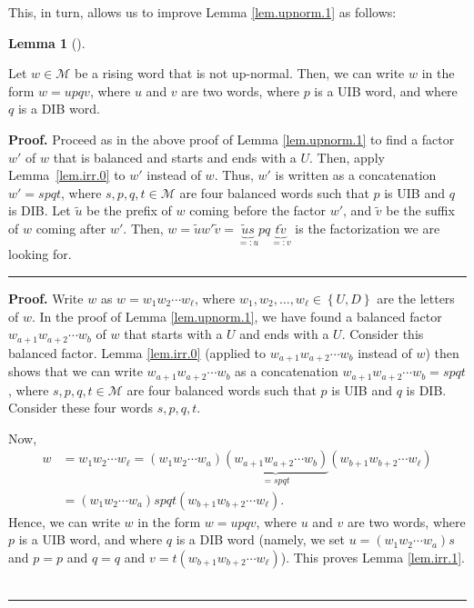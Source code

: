 \documentclass[numbers=enddot,12pt,final,onecolumn,notitlepage]{scrartcl}%
\theoremstyle{definition}
\newtheorem{lem}[theo]{Lemma}
\newenvironment{lemma}[1][]
{\begin{lem}[#1]\begin{leftbar}}
{\end{leftbar}\end{lem}}
\newenvironment{proof}[1][Proof]{\noindent\textbf{#1.} }{\ \rule{0.5em}{0.5em}}
\newcommand{\M}{\mathcal{M}}
\newenvironment{verlong}{}{}
\newenvironment{vershort}{}{}
\begin{document}
This, in turn, allows us to improve Lemma \ref{lem.upnorm.1} as follows:

\begin{lemma}
\label{lem.irr.1}Let $w\in\M$ be a rising word that is not up-normal.
Then, we can write $w$ in the form $w=upqv$, where $u$ and $v$ are two words,
where $p$ is a UIB word, and where $q$ is a DIB word.
\end{lemma}

\begin{vershort}
\begin{proof}
Proceed as in the above proof of Lemma \ref{lem.upnorm.1} to find a factor $w'$ of $w$ that is balanced and starts and ends with a $U$.
Then, apply Lemma~\ref{lem.irr.0} to $w'$ instead of $w$.
Thus, $w'$ is written as a concatenation $w' = spqt$,
where $s,p,q,t\in\M$ are four balanced words such that $p$ is UIB and $q$ is DIB.
Let $\widetilde{u}$ be the prefix of $w$ coming before the factor $w'$, and $\widetilde{v}$ be the suffix of $w$ coming after $w'$.
Then, $w = \widetilde{u} w' \widetilde{v} = \underbrace{\widetilde{u} s}_{=:u} p q \underbrace{t \widetilde{v}}_{=:v}$
is the factorization we are looking for.
\end{proof}
\end{vershort}

\begin{verlong}
\begin{proof}
Write $w$ as $w=w_{1}w_{2}\cdots w_{\ell}$, where $w_{1},w_{2},\ldots,w_{\ell
}\in\left\{  U,D\right\}  $ are the letters of $w$. In the proof of Lemma
\ref{lem.upnorm.1}, we have found a balanced factor $w_{a+1}w_{a+2}\cdots
w_{b}$ of $w$ that starts with a $U$ and ends with a $U$. Consider this
balanced factor. Lemma \ref{lem.irr.0} (applied to $w_{a+1}w_{a+2}\cdots
w_{b}$ instead of $w$) then shows that we can write $w_{a+1}w_{a+2}\cdots
w_{b}$ as a concatenation $w_{a+1}w_{a+2}\cdots w_{b}=spqt$, where
$s,p,q,t\in\M$ are four balanced words such that $p$ is UIB and $q$
is DIB. Consider these four words $s,p,q,t$.

Now,%
\begin{align*}
w  & =w_{1}w_{2}\cdots w_{\ell}=\left(  w_{1}w_{2}\cdots w_{a}\right)
\underbrace{\left(  w_{a+1}w_{a+2}\cdots w_{b}\right)  }_{=spqt}\left(
w_{b+1}w_{b+2}\cdots w_{\ell}\right)  \\
& =\left(  w_{1}w_{2}\cdots w_{a}\right)  spqt\left(  w_{b+1}w_{b+2}\cdots
w_{\ell}\right)  .
\end{align*}
Hence, we can write $w$ in the form $w=upqv$, where $u$ and $v$ are two words,
where $p$ is a UIB word, and where $q$ is a DIB word (namely, we set
$u=\left(  w_{1}w_{2}\cdots w_{a}\right)  s$ and $p=p$ and $q=q$ and
$v=t\left(  w_{b+1}w_{b+2}\cdots w_{\ell}\right)  $). This proves Lemma
\ref{lem.irr.1}.
\end{proof}
\end{verlong}
\end{document}
